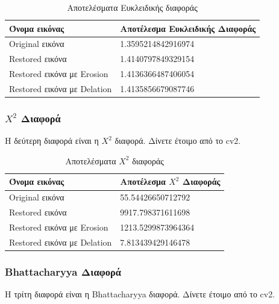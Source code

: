 \begin{table}[H]
  \centering
	\begin{tabular}{ | p{8cm} | p{8cm} | }
		\hline
		\textbf{Όνομα εικόνας} & \textbf{Αποτέλεσμα Ευκλειδικής Διαφοράς} \\
    \hline
    Original εικόνα & 1.3595214842916974 \\
    \hline
    Restored εικόνα & 1.4140797849329154 \\
    \hline
    Restored εικόνα με Erosion & 1.4136366487406054 \\
    \hline
    Restored εικόνα με Delation & 1.4135856679087746 \\
    \hline
	\end{tabular}
  \caption{Αποτελέσματα Ευκλειδικής διαφοράς}
  \label{tab:euclidean}
\end{table}

\newpage
\subsubsection{$ X^2 $ Διαφορά}

Η δεύτερη διαφορά είναι η $ X ^ 2 $ διαφορά. Δίνετε έτοιμο από το cv2.

\begin{table}[H]
  \centering
	\begin{tabular}{ | p{8cm} | p{8cm} | }
		\hline
		\textbf{Όνομα εικόνας} & \textbf{Αποτέλεσμα $ X^2 $ Διαφοράς} \\
    \hline
    Original εικόνα & 55.54426650712792 \\
    \hline
    Restored εικόνα & 9917.798371611698 \\
    \hline
    Restored εικόνα με Erosion & 1213.5299873964364 \\
    \hline
    Restored εικόνα με Delation & 7.813439429146478 \\
    \hline
	\end{tabular}
  \caption{Αποτελέσματα $ X^2 $ διαφοράς}
  \label{tab:chi_squared}
\end{table}

\subsubsection{Bhattacharyya Διαφορά}

Η τρίτη διαφορά είναι η Bhattacharyya διαφορά. Δίνετε έτοιμο από το cv2.

